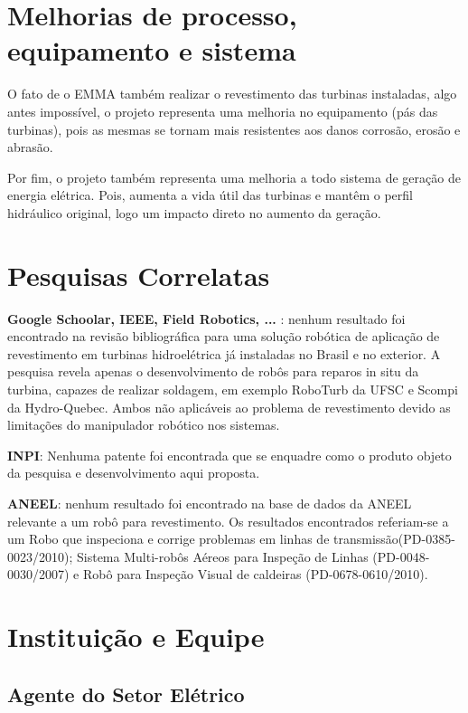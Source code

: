 
\section{Melhorias de processo, equipamento e sistema}

O fato de o EMMA também realizar o revestimento das turbinas instaladas, algo
antes impossível, o projeto representa uma melhoria no equipamento (pás das
turbinas), pois as mesmas se tornam mais resistentes aos danos corrosão, erosão e abrasão.

Por fim, o projeto também representa uma melhoria a todo sistema de geração de
energia elétrica. Pois, aumenta a vida útil das turbinas e mantêm o perfil
hidráulico original, logo um impacto direto no aumento da geração.

\section{Pesquisas Correlatas}

\textbf{Google Schoolar, IEEE, Field Robotics, ... }: nenhum resultado foi
encontrado na revisão bibliográfica para uma solução robótica de aplicação de
revestimento em turbinas hidroelétrica já instaladas no Brasil e no exterior. A
pesquisa revela apenas o desenvolvimento de robôs para reparos in situ da
turbina, capazes de realizar soldagem, em exemplo RoboTurb da UFSC e Scompi da
Hydro-Quebec. Ambos não aplicáveis ao problema de revestimento devido as
limitações do manipulador robótico nos sistemas.

\textbf{INPI}: Nenhuma patente foi encontrada que se enquadre como o produto
objeto da pesquisa e desenvolvimento aqui proposta.

\textbf{ANEEL}: nenhum resultado foi encontrado na base de dados da ANEEL
relevante a um robô para revestimento. Os resultados encontrados referiam-se a
um Robo que inspeciona e corrige problemas em linhas de
transmissão(PD-0385-0023/2010); Sistema Multi-robôs Aéreos para Inspeção de
Linhas (PD-0048-0030/2007) e Robô para Inspeção Visual de caldeiras
(PD-0678-0610/2010).

\section{Instituição e Equipe}


\subsection{Agente do Setor Elétrico} 

